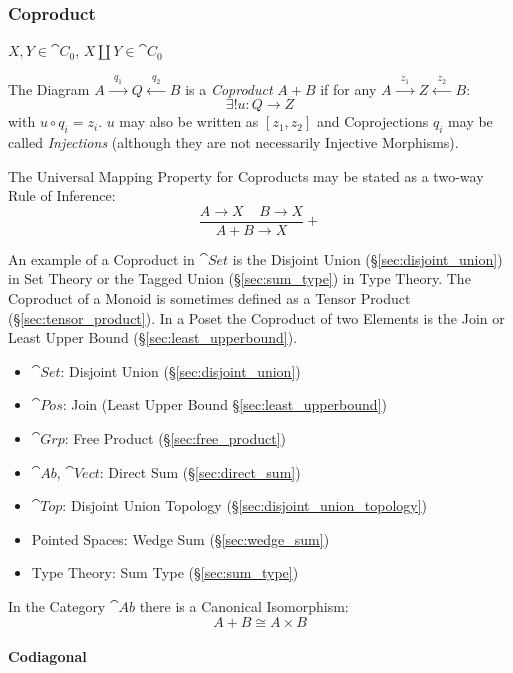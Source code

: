 \subsubsection{Coproduct}\label{sec:coproduct}

$X,Y \in \cat{C}_0$, $X \amalg Y \in \cat{C}_0$

The Diagram $A \xrightarrow{\;\;q_1\;\;} Q \xleftarrow{\;\;q_2\;\;} B$
is a \emph{Coproduct} $A + B$ if for any $A \xrightarrow{\;\;z_1\;\;}
Z \xleftarrow{\;\;z_2\;\;} B$:
\[
  \exists!u : Q \rightarrow Z
\]
with $u \circ q_i = z_i$. $u$ may also be written as $[ z_1, z_2 ]$
and Coprojections $q_i$ may be called \emph{Injections} (although they
are not necessarily Injective Morphisms).

The Universal Mapping Property for Coproducts may be stated as a
two-way Rule of Inference:
\[
  {
    \frac{A \rightarrow X \;\;\;\; B \rightarrow X}
    {A + B \rightarrow X}
  }+
\]

An example of a Coproduct in $\cat{Set}$ is the Disjoint Union
(\S\ref{sec:disjoint_union}) in Set Theory or the Tagged Union
(\S\ref{sec:sum_type}) in Type Theory. The Coproduct of a Monoid is
sometimes defined as a Tensor Product (\S\ref{sec:tensor_product}). In
a Poset the Coproduct of two Elements is the Join or Least Upper Bound
(\S\ref{sec:least_upperbound}).

\begin{itemize}
\item $\cat{Set}$: Disjoint Union (\S\ref{sec:disjoint_union})
\item $\cat{Pos}$: Join (Least Upper Bound
  \S\ref{sec:least_upperbound})
\item $\cat{Grp}$: Free Product (\S\ref{sec:free_product})
\item $\cat{Ab}$, $\cat{Vect}$: Direct Sum (\S\ref{sec:direct_sum})
\item $\cat{Top}$: Disjoint Union Topology
  (\S\ref{sec:disjoint_union_topology})
\item Pointed Spaces: Wedge Sum (\S\ref{sec:wedge_sum})
\item Type Theory: Sum Type (\S\ref{sec:sum_type})
\end{itemize}

In the Category $\cat{Ab}$ there is a Canonical
Isomorphism:\cite{awodey06}
\[
  A + B \cong A \times B
\]



\paragraph{Codiagonal}\label{sec:codiagonal}\hfill

